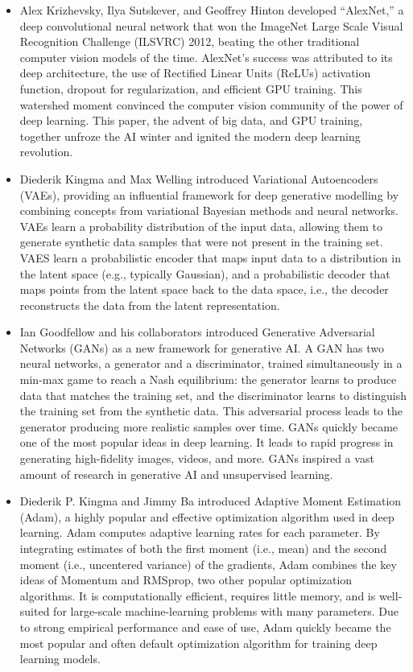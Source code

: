 \begin{itemize}
    \item \textbf{\cite{Krizhevsky2012}}
    Alex Krizhevsky, Ilya Sutskever, and Geoffrey Hinton developed ``AlexNet,'' a deep convolutional neural network that won the ImageNet Large Scale Visual Recognition Challenge (ILSVRC) 2012, beating the other traditional computer vision models of the time. AlexNet's success was attributed to its deep architecture, the use of Rectified Linear Units (ReLUs) activation function, dropout for regularization, and efficient GPU training. This watershed moment convinced the computer vision community of the power of deep learning. This paper, the advent of big data, and GPU training, together unfroze the AI winter and ignited the modern deep learning revolution. 
    
    \item \textbf{\cite{Kingma2013}}
    Diederik Kingma and Max Welling introduced Variational Autoencoders (VAEs), providing an influential framework for deep generative modelling by combining concepts from variational Bayesian methods and neural networks. VAEs learn a probability distribution of the input data, allowing them to generate synthetic data samples that were not present in the training set. VAES learn a probabilistic encoder that maps input data to a distribution in the latent space (e.g., typically Gaussian), and a probabilistic decoder that maps points from the latent space back to the data space, i.e., the decoder reconstructs the data from the latent representation. 
    
    \item \textbf{\cite{Goodfellow2014}}
    Ian Goodfellow and his collaborators introduced Generative Adversarial Networks (GANs) as a new framework for generative AI. A GAN has two neural networks, a generator and a discriminator, trained simultaneously in a min-max game to reach a Nash equilibrium: the generator learns to produce data that matches the training set, and the discriminator learns to distinguish the training set from the synthetic data. This adversarial process leads to the generator producing more realistic samples over time. GANs quickly became one of the most popular ideas in deep learning. It leads to rapid progress in generating high-fidelity images, videos, and more. GANs inspired a vast amount of research in generative AI and unsupervised learning. 
    
    \item \textbf{\cite{Kingma2014}}
    Diederik P. Kingma and Jimmy Ba introduced Adaptive Moment Estimation (Adam), a highly popular and effective optimization algorithm used in deep learning. Adam computes adaptive learning rates for each parameter. By integrating estimates of both the first moment (i.e., mean) and the second moment (i.e., uncentered variance) of the gradients, Adam combines the key ideas of Momentum and RMSprop, two other popular optimization algorithms. It is computationally efficient, requires little memory, and is well-suited for large-scale machine-learning problems with many parameters. Due to strong empirical performance and ease of use, Adam quickly became the most popular and often default optimization algorithm for training deep learning models. 
    

\end{itemize}
